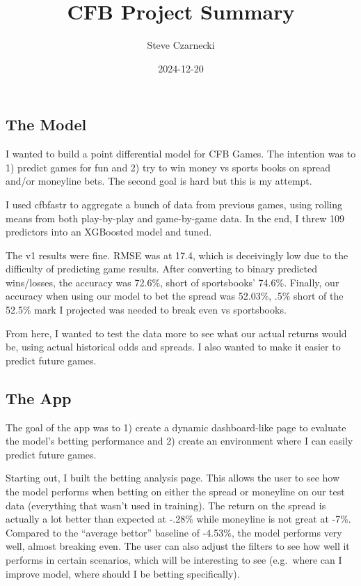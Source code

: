 \documentclass[
]{article}
\title{CFB Project Summary}
\author{Steve Czarnecki}
\date{2024-12-20}
\begin{document}
\maketitle

\subsection{The Model}\label{the-model}

I wanted to build a point differential model for CFB Games. The
intention was to 1) predict games for fun and 2) try to win money vs
sports books on spread and/or moneyline bets. The second goal is hard
but this is my attempt.

I used cfbfastr to aggregate a bunch of data from previous games, using
rolling means from both play-by-play and game-by-game data. In the end,
I threw 109 predictors into an XGBoosted model and tuned.

The v1 results were fine. RMSE was at 17.4, which is deceivingly low due
to the difficulty of predicting game results. After converting to binary
predicted wins/losses, the accuracy was 72.6\%, short of sportsbooks'
74.6\%. Finally, our accuracy when using our model to bet the spread was
52.03\%, .5\% short of the 52.5\% mark I projected was needed to break
even vs sportsbooks.

From here, I wanted to test the data more to see what our actual returns
would be, using actual historical odds and spreads. I also wanted to
make it easier to predict future games.

\subsection{The App}\label{the-app}

The goal of the app was to 1) create a dynamic dashboard-like page to
evaluate the model's betting performance and 2) create an environment
where I can easily predict future games.

Starting out, I built the betting analysis page. This allows the user to
see how the model performs when betting on either the spread or
moneyline on our test data (everything that wasn't used in training).
The return on the spread is actually a lot better than expected at
-.28\% while moneyline is not great at -7\%. Compared to the ``average
bettor'' baseline of -4.53\%, the model performs very well, almost
breaking even. The user can also adjust the filters to see how well it
performs in certain scenarios, which will be interesting to see
(e.g.~where can I improve model, where should I be betting
specifically).
\end{document}
